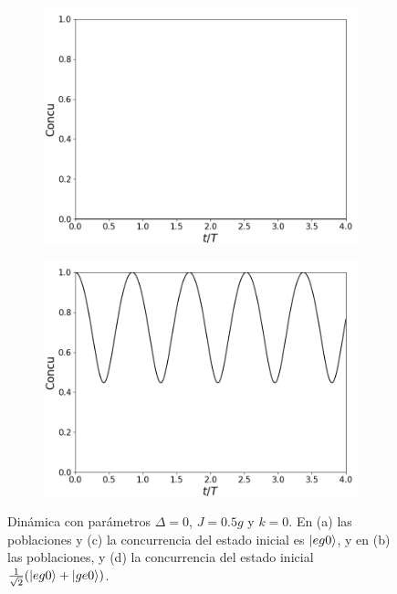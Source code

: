 \begin{figure}[H]
\begin{subfigure}{0.49\textwidth}
        \caption{}
        \label{fig4:pob j eg0 sim}
    \end{subfigure}
    \vfill
    \begin{subfigure}{0.49\textwidth}
        \includegraphics[width=\textwidth]{figuras/ch4/j eg0 concu.png}
        \caption{}
        \label{fig4:pob j eg0}
    \end{subfigure}
    \hfill
    \begin{subfigure}{0.49\textwidth}
        \includegraphics[width=\textwidth]{figuras/ch4/j eg0+ge0 concu.png}
        \caption{}
        \label{fig4:pob j eg0 sim}
    \end{subfigure}
    \caption{Dinámica con parámetros $\Delta=0$, $J=0.5g$ y $k=0$. En (a) las poblaciones y (c) la concurrencia del estado inicial es $\ket{eg0}$, y en (b) las poblaciones, y (d) la concurrencia del estado inicial $\frac{1}{\sqrt{2}}(\ket{eg0}+\ket{ge0})$.}
    \label{fig4:j alpha0}
\end{figure}
